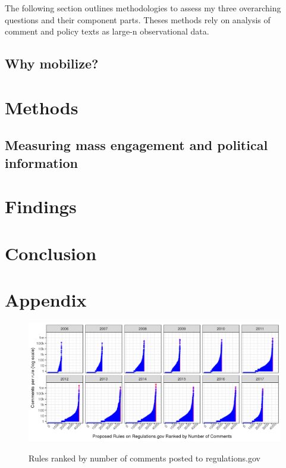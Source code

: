 \documentclass{article}
\begin{document}
The following section outlines methodologies to assess my three overarching questions and their component parts. Theses methods rely on analysis of comment and policy texts as large-n observational data. 


\subsection{Why mobilize?} \label{whymail-intro}




\section{Methods}

\subsection{Measuring mass engagement and political information}
\label{whyMail-methods}



\section{Findings}


\section{Conclusion}


\newpage
\section{Appendix}



\begin{figure}[h!]
    \centering
        \caption{Rules ranked by number of comments posted to regulations.gov}
    \includegraphics[width = 6.5in]{Figs/rules-ranked-comments-per-year-1.png}
    \label{fig:rules-ranked}
\end{figure}
\end{document}
